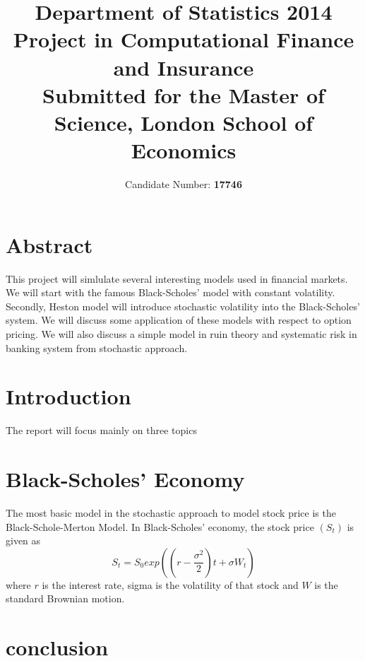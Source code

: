 \documentclass[a4paper,draft, 11pt]{article}
\begin{document}
\title{Department of Statistics 2014\\ {\bf Project in Computational Finance and Insurance}\\ {\small Submitted for the Master of Science, London School of Economics} }
\author{Candidate Number: \bf 17746}
\maketitle
\vfill
\section{Abstract}
This project will simlulate several interesting models used in financial markets. We will start with the famous Black-Scholes' model with constant volatility. Secondly, Heston model will introduce stochastic volatility into the Black-Scholes' system. We will discuss some application of these models with respect to option pricing.
We will also discuss a simple model in ruin theory and systematic risk in banking system from stochastic approach.

\newpage

\section{Introduction}
The report will focus mainly on three topics 

\section{Black-Scholes' Economy}
The most basic model in the stochastic approach to model stock price is the Black-Schole-Merton Model. In Black-Scholes' economy, the stock price $(S_t)$ is given as
$$S_t = S_0 exp\left( (r - \frac{\sigma^2}{2} )t + \sigma W_t \right)$$
where $r$ is the interest rate, sigma is the volatility of that stock and $W$ is the standard Brownian motion.



\section{conclusion}




%
%
\end{document}
